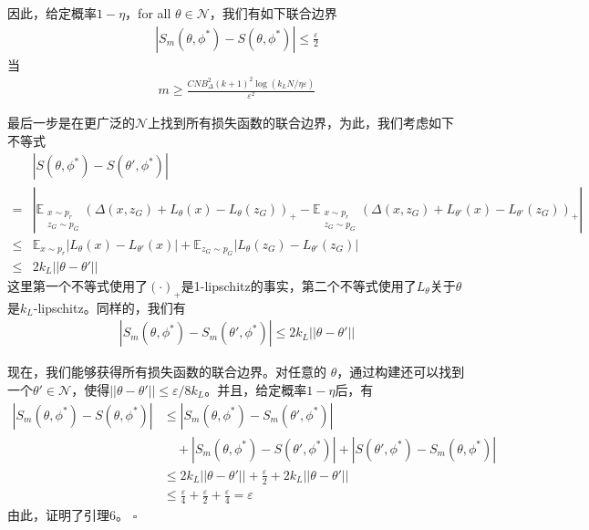 \begin{Proof}
            \par
            因此，给定概率$1-\eta$，for all $\theta\in \mathcal{N}$，我们有如下联合边界
            \begin{align*}
            |S_m(\theta,\phi^*) - S(\theta,\phi^*)| \leqslant \frac{\varepsilon}{2}
            \end{align*}
            当
            \begin{align*}
            m \geqslant \frac{CNB_\Delta^2(k+1)^2\log (k_LN/\eta\varepsilon)}{\varepsilon^2}
            \end{align*}
            \par
            最后一步是在更广泛的$\mathcal{N}$上找到所有损失函数的联合边界，为此，我们考虑如下不等式
            \begin{align*}
            &|S(\theta,\phi^*)-S(\theta',\phi^*)|\\
            ={}&|\mathbb{E}_{\substack{x\sim p_r\\z_G\sim p_G}}(\Delta(x,z_G)+L_\theta(x)-L_\theta(z_G) )_+ -\mathbb{E}_{\substack{x\sim p_r\\z_G\sim p_G} }(\Delta(x,z_G)+L_{\theta'}(x) - L_{\theta'}(z_G))_+  |\\
            \leqslant{}& \mathbb{E}_{x\sim p_r}|L_\theta(x) - L_{\theta'}(x)|+\mathbb{E}_{z_G\sim p_G}| L_\theta(z_G) - L_{\theta'}(z_G) |\\
            \leqslant {}& 2k_L||\theta - \theta '||
            \end{align*}
            这里第一个不等式使用了$(\cdot)_+$是1-lipschitz的事实，第二个不等式使用了$L_\theta$关于$\theta$是$k_L$-lipschitz。同样的，我们有
            \begin{align*}
            |S_m(\theta,\phi^*) - S_m(\theta',\phi^*)| \leqslant 2 k_L||\theta-\theta'||
            \end{align*}
            \par
            现在，我们能够获得所有损失函数的联合边界。对任意的 $\theta$，通过构建还可以找到一个$\theta'\in \mathcal{N}$，使得$||\theta-\theta'|| \leqslant \varepsilon/8k_L$。并且，给定概率$1-\eta$后，有
            \begin{align*}
            |S_m(\theta,\phi^*) - S(\theta,\phi^*)| &\leqslant |S_m(\theta,\phi^*) - S_m(\theta',\phi^*)|\\
            & \quad + |S_m(\theta,\phi^*) - S(\theta',\phi^*)| +  |S(\theta',\phi^*) - S_m(\theta,\phi^*)| \\
            & \leqslant 2k_L||\theta-\theta'|| + \frac{\varepsilon}{2}+2k_L||\theta-\theta'||\\
            & \leqslant \frac{\varepsilon }{4} +\frac{\varepsilon}{2}+\frac{\varepsilon}{4} = \varepsilon
            \end{align*}
            由此，证明了引理6。
            $\square$
            \end{Proof}
